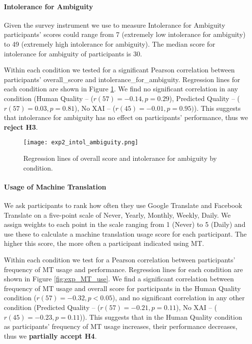 \paragraph{Intolerance for Ambiguity} 

Given the survey instrument we use to measure Intolerance for Ambiguity\cite{gellerTolerance1993} participants’ scores could range from 7 (extremely low intolerance for ambiguity) to 49 (extremely high intolerance for ambiguity). The median score for intolerance for ambiguity of participants is 30. 

Within each condition we tested for a significant Pearson correlation between participants’ overall\_score and intolerance\_for\_ambiguity. Regression lines for each condition are shown in Figure \ref{fig:exp_intol_ambiguity}. We find no significant correlation in any condition (Human Quality -- ($r(57) = -0.14, p = 0.29$), Predicted Quality --  ($r(57) = 0.03, p = 0.81$), No XAI -- ($r(45) = -0.01, p = 0.95)$). This suggests that intolerance for ambiguity has no effect on participants' performance, thus we \textbf{reject H3}. 

\begin{figure}[h!]
    \centering
    \texttt{[image: exp2\_intol\_ambiguity.png]}
    \caption{Regression lines of overall score and intolerance for ambiguity by condition.}
    \label{fig:exp_intol_ambiguity}
\end{figure}

\paragraph{Usage of Machine Translation} 
We ask participants to rank how often they use Google Translate and Facebook Translate on a five-point scale of Never, Yearly, Monthly, Weekly, Daily. We assign weights to each point in the scale ranging from 1 (Never) to 5 (Daily) and use these to calculate a machine translation usage score for each participant. The higher this score, the more often a participant indicated using MT. 

Within each condition we test for a Pearson correlation between participants’ frequency of MT usage and performance. Regression lines for each condition are shown in Figure \ref{fig:exp_MT_use}. We find a significant correlation between frequency of MT usage and overall score for participants in the Human Quality condition ($r(57) = -0.32, p < 0.05$), and no significant correlation in any other condition (Predicted Quality -- ($r(57) = -0.21, p = 0.11$), No XAI -- ($r(45) = -0.23, p = 0.11$)). This suggests that in the Human Quality condition as participants’ frequency of MT usage increases, their performance decreases, thus we \textbf{partially accept H4}.

